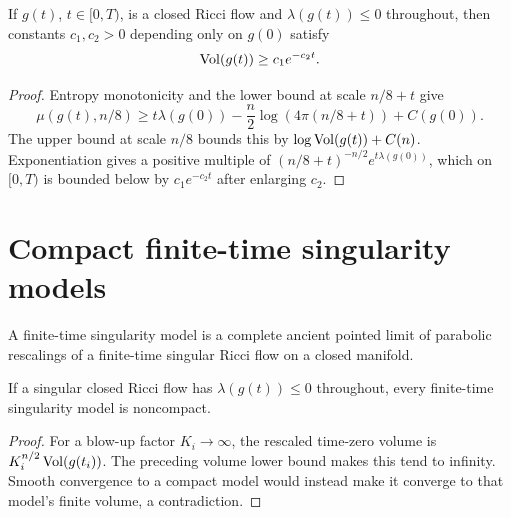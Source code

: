 \begin{lemma}
\label{lem:chow-iii-ch17-volume-lower-nonpositive-lambda}


If $g(t)$, $t\in[0,T)$, is a closed Ricci flow and
$\lambda(g(t))\le0$ throughout, then constants $c_1,c_2>0$ depending only
on $g(0)$ satisfy
\[
 \operatorname{Vol}(g(t))\ge c_1e^{-c_2t}.
\]
\end{lemma}
\begin{proof}
\sketch Entropy monotonicity and the lower bound at scale $n/8+t$ give
\[
 \mu(g(t),n/8)\ge t\lambda(g(0))
 -\frac n2\log(4\pi(n/8+t))+C(g(0)).
\]
The upper bound at scale $n/8$ bounds this by
$\log\operatorname{Vol}(g(t))+C(n)$.  Exponentiation gives a positive multiple of
$(n/8+t)^{-n/2}e^{t\lambda(g(0))}$, which on $[0,T)$ is bounded below by
$c_1e^{-c_2t}$ after enlarging $c_2$.
\end{proof}

\section{Compact finite-time singularity models}

\begin{remark}
\label{rem:chow-iii-ch17-singularity-models}

A finite-time singularity model is a complete ancient pointed limit of
parabolic rescalings of a finite-time singular Ricci flow on a closed
manifold.
\end{remark}

\begin{lemma}
\label{lem:chow-iii-ch17-model-noncompact-nonpositive-lambda}


If a singular closed Ricci flow has $\lambda(g(t))\le0$ throughout, every
finite-time singularity model is noncompact.
\end{lemma}
\begin{proof}
\sketch For a blow-up factor $K_i\to\infty$, the rescaled time-zero volume is
$K_i^{n/2}\operatorname{Vol}(g(t_i))$.  The preceding volume lower bound makes this tend
to infinity.  Smooth convergence to a compact model would instead make it
converge to that model's finite volume, a contradiction.
\end{proof}

